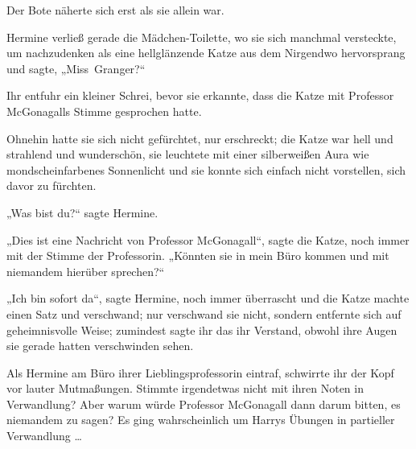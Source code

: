 
Der Bote näherte sich erst als sie allein war.

Hermine verließ gerade die Mädchen-Toilette, wo sie sich manchmal versteckte, um nachzudenken als eine hellglänzende Katze aus dem Nirgendwo hervorsprang und sagte,
„Miss~Granger?“

Ihr entfuhr ein kleiner Schrei, bevor sie erkannte, dass die Katze mit Professor McGonagalls Stimme gesprochen hatte.

Ohnehin hatte sie sich nicht gefürchtet, nur erschreckt; die Katze war hell und strahlend und wunderschön, sie leuchtete mit einer silberweißen Aura wie mondscheinfarbenes Sonnenlicht und sie konnte sich einfach nicht vorstellen, sich davor zu fürchten.

„Was bist du?“ sagte Hermine.

„Dies ist eine Nachricht von Professor McGonagall“, sagte die Katze, noch immer mit der Stimme der Professorin.
„Könnten sie in mein Büro kommen und mit niemandem hierüber sprechen?“

„Ich bin sofort da“, sagte Hermine, noch immer überrascht und die Katze machte einen Satz und verschwand; nur verschwand sie nicht, sondern entfernte sich auf geheimnisvolle Weise; zumindest sagte ihr das ihr Verstand, obwohl ihre Augen sie gerade hatten verschwinden sehen.

Als Hermine am Büro ihrer Lieblingsprofessorin eintraf, schwirrte ihr der Kopf vor lauter Mutmaßungen. Stimmte irgendetwas nicht mit ihren Noten in Verwandlung? Aber warum würde Professor McGonagall dann darum bitten, es niemandem zu sagen? Es ging wahrscheinlich um Harrys Übungen in partieller Verwandlung …

